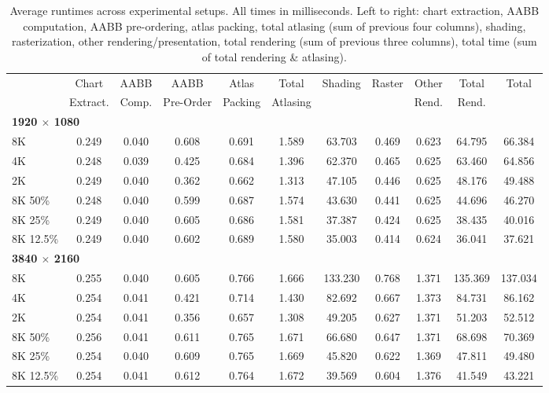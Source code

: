 \begin{table}
\vspace{1mm}
\scriptsize
\setlength{\tabcolsep}{1pt}
\tiny
\centering
\begin{tabular}{l|cccc|c|ccc|c||c}
& Chart    & AABB  & AABB      & Atlas   & Total    & Shading & Raster & Other & Total   & Total   \\
& Extract. & Comp. & Pre-Order & Packing & Atlasing &         &        & Rend. & Rend.   &         \\
\hline
\multicolumn{11}{l}{\textbf{1920 $\times$ 1080}} \\
8K        & 0.249 & 0.040 & 0.608 & 0.691 & 1.589 & 63.703  & 0.469 & 0.623 & 64.795  & 66.384  \\
4K        & 0.248 & 0.039 & 0.425 & 0.684 & 1.396 & 62.370  & 0.465 & 0.625 & 63.460  & 64.856  \\
2K        & 0.249 & 0.040 & 0.362 & 0.662 & 1.313 & 47.105  & 0.446 & 0.625 & 48.176  & 49.488  \\
\hline
8K 50\%   & 0.248 & 0.040 & 0.599 & 0.687 & 1.574 & 43.630  & 0.441 & 0.625 & 44.696  & 46.270  \\
8K 25\%   & 0.249 & 0.040 & 0.605 & 0.686 & 1.581 & 37.387  & 0.424 & 0.625 & 38.435  & 40.016  \\
8K 12.5\% & 0.249 & 0.040 & 0.602 & 0.689 & 1.580 & 35.003  & 0.414 & 0.624 & 36.041  & 37.621  \\
\hline
\multicolumn{11}{l}{\textbf{3840 $\times$ 2160}} \\
8K        & 0.255 & 0.040 & 0.605 & 0.766 & 1.666 & 133.230 & 0.768 & 1.371 & 135.369 & 137.034 \\
4K        & 0.254 & 0.041 & 0.421 & 0.714 & 1.430 & 82.692  & 0.667 & 1.373 & 84.731  & 86.162  \\
2K        & 0.254 & 0.041 & 0.356 & 0.657 & 1.308 & 49.205  & 0.627 & 1.371 & 51.203  & 52.512  \\
\hline
8K 50\%   & 0.256 & 0.041 & 0.611 & 0.765 & 1.671 & 66.680  & 0.647 & 1.371 & 68.698  & 70.369  \\
8K 25\%   & 0.254 & 0.040 & 0.609 & 0.765 & 1.669 & 45.820  & 0.622 & 1.369 & 47.811  & 49.480  \\
8K 12.5\% & 0.254 & 0.041 & 0.612 & 0.764 & 1.672 & 39.569  & 0.604 & 1.376 & 41.549  & 43.221 
\end{tabular}
\vspace{1mm}
\caption{Average runtimes across experimental setups. All times in milliseconds. Left to right: chart extraction, AABB computation, AABB pre-ordering, atlas packing, total atlasing (sum of previous four columns), shading, rasterization, other rendering/presentation, total rendering (sum of previous three columns), total time (sum of total rendering \& atlasing). }
\label{tab:runtimes}
\vspace{-3mm}
\end{table}
